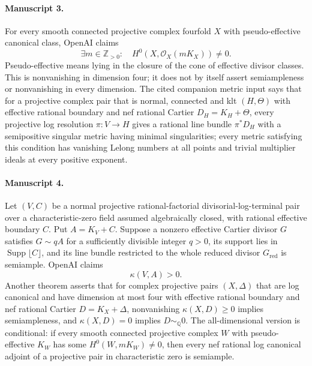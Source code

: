 \documentclass[11pt]{article}
\begin{document}
\paragraph{Manuscript 3.}
For every smooth connected projective complex fourfold $X$ with pseudo-effective canonical class, OpenAI claims
\[
\exists m\in\mathbb Z_{>0}:\quad H^0(X,\mathcal O_X(mK_X))\ne0.
\]
Pseudo-effective means lying in the closure of the cone of effective divisor classes. This is nonvanishing in dimension four; it does not by itself assert semiampleness or nonvanishing in every dimension.
The cited companion metric input says that for a projective complex pair that is normal, connected and klt $(H,\Theta)$ with effective rational boundary and nef rational Cartier $D_H=K_H+\Theta$, every projective log resolution $\pi:V\to H$ gives a rational line bundle $\pi^*D_H$ with a semipositive singular metric having minimal singularities; every metric satisfying this condition has vanishing Lelong numbers at all points and trivial multiplier ideals at every positive exponent.

\paragraph{Manuscript 4.}
Let $(V,C)$ be a normal projective rational-factorial divisorial-log-terminal pair over a characteristic-zero field assumed algebraically closed, with rational effective boundary $C$. Put $A=K_V+C$. Suppose a nonzero effective Cartier divisor $G$ satisfies $G\sim qA$ for a sufficiently divisible integer $q>0$, its support lies in $\operatorname{Supp}\lfloor C\rfloor$, and its line bundle restricted to the whole reduced divisor $G_{\mathrm{red}}$ is semiample. OpenAI claims
\[
\kappa(V,A)>0.
\]
Another theorem asserts that for complex projective pairs $(X,\Delta)$ that are log canonical and have dimension at most four with effective rational boundary and nef rational Cartier $D=K_X+\Delta$, nonvanishing $\kappa(X,D)\ge0$ implies semiampleness, and $\kappa(X,D)=0$ implies $D\sim_{\mathbb Q}0$.
The all-dimensional version is conditional: if every smooth connected projective complex $W$ with pseudo-effective $K_W$ has some $H^0(W,mK_W)\ne0$, then every nef rational log canonical adjoint of a projective pair in characteristic zero is semiample.
\end{document}
